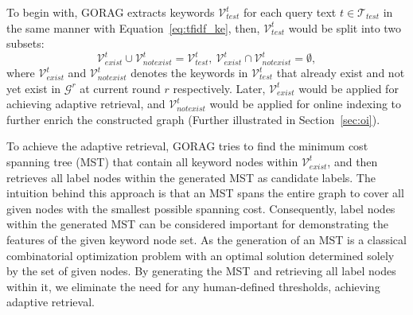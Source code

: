 To begin with, GORAG extracts keywords $\mathcal{V}_{test}^t$ for each query text $t\in \mathcal{T}_{test}$ in the same manner with Equation~\eqref{eq:tfidf_ke}, then, $\mathcal{V}_{test}^t$ would be split into two subsets: 
\begin{equation}
	\mathcal{V}_{exist}^t \cup \mathcal{V}_{notexist}^t  =\mathcal{V}_{test}^t,\ \mathcal{V}_{exist}^t \cap \mathcal{V}_{notexist}^t  = \emptyset, 
\end{equation}
where $\mathcal{V}_{exist}^t $ and $\mathcal{V}_{notexist}^t$ denotes the keywords in $\mathcal{V}_{test}^t$ that already exist and not yet exist in $\mathcal{G}^r$ at current round $r$ respectively. Later, $\mathcal{V}_{exist}^t $ would be applied for achieving adaptive retrieval, and $\mathcal{V}_{notexist}^t$ would be applied for online indexing to further enrich the constructed graph (Further illustrated in Section~\ref{sec:oi}).


To achieve the adaptive retrieval, GORAG tries to find the minimum cost spanning tree (MST) that contain all keyword nodes within $\mathcal{V}_{exist}^t$, 
and then retrieves all label nodes within the generated MST as candidate labels.
The intuition behind this approach is that an MST spans the entire graph to cover all given nodes with the smallest possible spanning cost. Consequently, label nodes within the generated MST can be considered important for demonstrating the features of the given keyword node set. As the generation of an MST is a classical combinatorial optimization problem with an optimal solution determined solely by the set of given nodes. 
By generating the MST and retrieving all label nodes within it, we eliminate the need for any human-defined thresholds, achieving adaptive retrieval.


